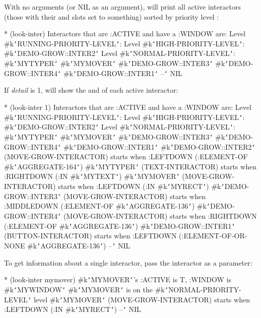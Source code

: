 With no arguments (or NIL as an argument),  will print all
active interactors
(those with their  and  slots set to something)
sorted by priority level :
\begin{programexample}
* (look-inter)
Interactors that are :ACTIVE and have a :WINDOW are:
Level \#k{\tt\char`\<}RUNNING-PRIORITY-LEVEL{\tt\char`\>}:
Level \#k{\tt\char`\<}HIGH-PRIORITY-LEVEL{\tt\char`\>}: \#k{\tt\char`\<}DEMO-GROW::INTER2{\tt\char`\>}
Level \#k{\tt\char`\<}NORMAL-PRIORITY-LEVEL{\tt\char`\>}: \#k{\tt\char`\<}MYTYPER{\tt\char`\>} \#k{\tt\char`\<}MYMOVER{\tt\char`\>} \#k{\tt\char`\<}DEMO-GROW::INTER3{\tt\char`\>}
 \#k{\tt\char`\<}DEMO-GROW::INTER4{\tt\char`\>} \#k{\tt\char`\<}DEMO-GROW::INTER1{\tt\char`\>}
--{\tt\char`\>} NIL
\end{programexample}

If {\it detail} is 1,  will show the  and
 of each active interactor:
\begin{programexample}
* (look-inter 1)
Interactors that are :ACTIVE and have a :WINDOW are:
Level \#k{\tt\char`\<}RUNNING-PRIORITY-LEVEL{\tt\char`\>}:
Level \#k{\tt\char`\<}HIGH-PRIORITY-LEVEL{\tt\char`\>}: \#k{\tt\char`\<}DEMO-GROW::INTER2{\tt\char`\>}
Level \#k{\tt\char`\<}NORMAL-PRIORITY-LEVEL{\tt\char`\>}: \#k{\tt\char`\<}MYTYPER{\tt\char`\>} \#k{\tt\char`\<}MYMOVER{\tt\char`\>} \#k{\tt\char`\<}DEMO-GROW::INTER3{\tt\char`\>}
 \#k{\tt\char`\<}DEMO-GROW::INTER4{\tt\char`\>} \#k{\tt\char`\<}DEMO-GROW::INTER1{\tt\char`\>}
\#k{\tt\char`\<}DEMO-GROW::INTER2{\tt\char`\>} (MOVE-GROW-INTERACTOR)
   starts when :LEFTDOWN (:ELEMENT-OF \#k{\tt\char`\<}AGGREGATE-164{\tt\char`\>})
\#k{\tt\char`\<}MYTYPER{\tt\char`\>} (TEXT-INTERACTOR)
   starts when :RIGHTDOWN (:IN \#k{\tt\char`\<}MYTEXT{\tt\char`\>})
\#k{\tt\char`\<}MYMOVER{\tt\char`\>} (MOVE-GROW-INTERACTOR)
   starts when :LEFTDOWN (:IN \#k{\tt\char`\<}MYRECT{\tt\char`\>})
\#k{\tt\char`\<}DEMO-GROW::INTER3{\tt\char`\>} (MOVE-GROW-INTERACTOR)
   starts when :MIDDLEDOWN (:ELEMENT-OF \#k{\tt\char`\<}AGGREGATE-136{\tt\char`\>})
\#k{\tt\char`\<}DEMO-GROW::INTER4{\tt\char`\>} (MOVE-GROW-INTERACTOR)
   starts when :RIGHTDOWN (:ELEMENT-OF \#k{\tt\char`\<}AGGREGATE-136{\tt\char`\>})
\#k{\tt\char`\<}DEMO-GROW::INTER1{\tt\char`\>} (BUTTON-INTERACTOR)
   starts when :LEFTDOWN (:ELEMENT-OF-OR-NONE \#k{\tt\char`\<}AGGREGATE-136{\tt\char`\>})
--{\tt\char`\>} NIL
\end{programexample}
To get information about a single interactor, pass
the interactor as a parameter:
\begin{programexample}
* (look-inter mymover)
\#k{\tt\char`\<}MYMOVER{\tt\char`\>}'s :ACTIVE is T, :WINDOW is \#k{\tt\char`\<}MYWINDOW{\tt\char`\>}
\#k{\tt\char`\<}MYMOVER{\tt\char`\>} is on the \#k{\tt\char`\<}NORMAL-PRIORITY-LEVEL{\tt\char`\>} level
\#k{\tt\char`\<}MYMOVER{\tt\char`\>} (MOVE-GROW-INTERACTOR)
   starts when :LEFTDOWN (:IN \#k{\tt\char`\<}MYRECT{\tt\char`\>})
--{\tt\char`\>} NIL
\end{programexample}

